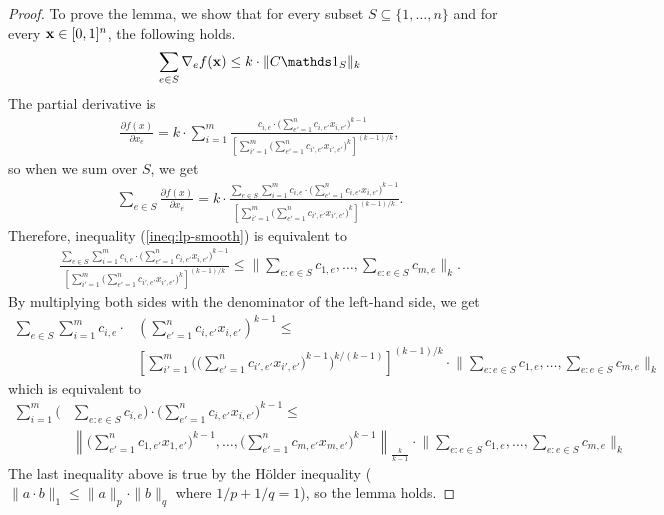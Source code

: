 \begin{proof}
To prove the lemma, we show that for every subset $S \subseteq \{1, \ldots, n\}$ and for every $\mathbf{x} \in [0,1]^{n}$, the following holds.
%
\begin{align}	\label{ineq:lp-smooth}
\sum_{e \in S} \nabla_{e} f(\vect{x}) \leq  k \cdot \|C \one_{S}\|_{k}
\end{align}
%
The partial derivative is
%
\begin{align*}
\frac{\partial f(x)}{\partial x_{e}}
= k \cdot \sum_{i = 1}^{m} \frac{c_{i,e} \cdot \bigl( \sum_{e' = 1}^{n} c_{i,e'} x_{i,e'} \bigr)^{k-1} }{ \left[ \sum_{i' = 1}^{m}
		\bigl( \sum_{e'= 1}^{n} c_{i',e'} x_{i',e'} \bigr)^{k} \right]^{(k-1)/k}},
\end{align*}
so when we sum over $S$, we get
\begin{align*}
\sum_{e \in S} \frac{\partial f(x)}{\partial x_{e}}
= k \cdot \frac{ \sum_{e \in S} \sum_{i = 1}^{m} c_{i,e} \cdot \bigl( \sum_{e' = 1}^{n} c_{i,e'} x_{i,e'} \bigr)^{k-1} }{ \left[ \sum_{i' = 1}^{m} \bigl( \sum_{e'= 1}^{n} c_{i',e'} x_{i',e'} \bigr)^{k} \right]^{(k-1)/k}}.
\end{align*}
%
Therefore, inequality (\ref{ineq:lp-smooth}) is equivalent to
\begin{align*}
\frac{ \sum_{e \in S} \sum_{i = 1}^{m} c_{i,e} \cdot \bigl( \sum_{e' = 1}^{n} c_{i,e'} x_{i,e'} \bigr)^{k-1} }{ \left[ \sum_{i' = 1}^{m} \bigl( \sum_{e'= 1}^{n} c_{i',e'} x_{i',e'} \bigr)^{k} \right]^{(k-1)/k}}
	\leq   \biggl \|  \sum_{e: e \in S} c_{1,e}, \ldots , \sum_{e: e \in S} c_{m,e}  \biggr \|_{k}.
\end{align*}
%
By multiplying both sides with the denominator of the left-hand side, we get
%
\begin{align*}
    \sum_{e \in S} \sum_{i = 1}^{m} c_{i,e} \cdot & \left( \sum_{e' = 1}^{n} c_{i,e'} x_{i,e'} \right)^{k-1} \leq \\
    & \left[ \sum_{i'=1}^{m} \biggl( \biggl( \sum_{e'= 1}^{n} c_{i',e'} x_{i',e'} \biggr)^{k-1} \biggr)^{k/(k-1)} \right]^{(k-1)/k} \cdot \biggl \| \sum_{e: e \in S} c_{1,e}, \ldots, \sum_{e: e \in S} c_{m,e} \biggr \|_{k}
\end{align*}
which is equivalent to
\begin{align*}
    \sum_{i=1}^{m} \biggl( & \sum_{e: e \in S} c_{i,e} \biggr) \cdot \biggl( \sum_{e'=1}^{n} c_{i,e'} x_{i,e'} \biggr)^{k-1} \leq \\
    & \left \| \biggl( \sum_{e'=1}^{n} c_{1,e'} x_{1,e'} \biggr)^{k-1}, \ldots, \biggl( \sum_{e'=1}^{n} c_{m,e'} x_{m,e'} \biggr)^{k-1} \right \|_{\frac{k}{k-1}} \cdot \biggl \| \sum_{e: e \in S} c_{1,e} ,\ldots,  \sum_{e: e \in S} c_{m,e} \biggr \|_{k}
\end{align*}
The last inequality above is true by the H\"older inequality ($\| a \cdot b\|_{1} \leq \| a \|_{p} \cdot \| b \|_{q}$ where $1/p + 1/q = 1$), so the lemma holds.
\end{proof}

